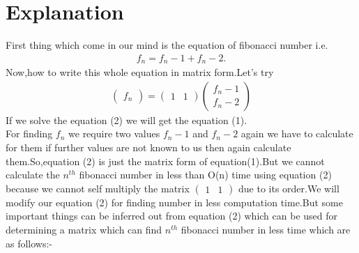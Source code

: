 \documentclass[journal,12pt,twocolumn]{IEEEtran}
\begin{document}
\section{Explanation}
First thing which come in our mind is the equation of fibonacci number i.e.
\begin{align}
\boxed{f_n=f_n-1 + f_n-2}.
\end{align}
Now,how to write this whole equation in matrix form.Let's try
\begin{align}
    \begin{pmatrix}f_n\end{pmatrix}=\begin{pmatrix}1 & 1\end{pmatrix}\begin{pmatrix}f_n-1\\f_n-2\end{pmatrix}
\end{align}
If we solve the equation (2) we will get the equation (1).\\
For finding $f_n$ we require two values $f_n-1$ and $f_n-2$ again we have to calculate for them if further values are not known to us then again calculate them.So,equation (2) is just the matrix form of equation(1).But we cannot calculate the $n^{th}$ fibonacci number in less than O(n) time using equation (2) because we cannot self multiply the matrix $\begin{pmatrix}1 & 1\end{pmatrix}$ due to its order.We will modify our equation (2) for finding number in less computation time.But some important things can be inferred out from equation (2) which can be used for determining a matrix which can find $n^{th}$ fibonacci number in less time which are as follows:-
\end{document}
